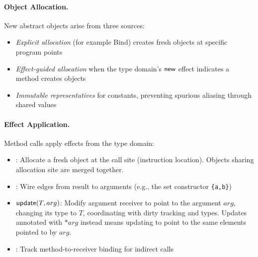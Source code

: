 \paragraph{Object Allocation.}
New abstract objects arise from three sources:
\begin{itemize}
\item \emph{Explicit allocation} (for example \textsf{Bind}) creates fresh objects at specific program points
\item \emph{Effect-guided allocation} when the type domain's $\textsf{new}$ effect indicates a method creates objects  
\item \emph{Immutable representatives} for constants, preventing spurious aliasing through shared values
\end{itemize}

\paragraph{Effect Application.}
Method calls apply effects from the type domain:
\begin{itemize}
\item \tnew: Allocate a fresh object at the call site (instruction location). Objects sharing allocation site are merged together.
\item \tptstoargs: Wire edges from result to arguments (e.g., the set constructor \texttt{\{a,b\}})
\item $\textsf{update}(T, arg)$: Modify argument receiver to point to the argument $arg$, changing its type to $T$, coordinating with dirty tracking and types. Updates annotated with $*arg$ instead means updating to point to the same elements pointed to by $arg$. 
\item \tboundmeth: Track method-to-receiver binding for indirect calls
\end{itemize}

